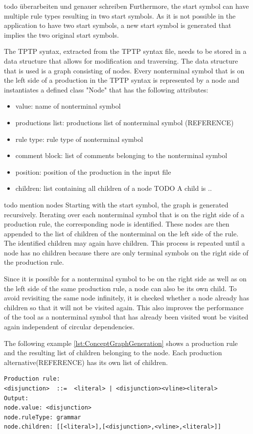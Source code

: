 todo überarbeiten und genauer schreiben
Furthermore, the start symbol can have multiple rule types resulting in two start symbols. As it is not possible in the application to have two start symbols, a new start symbol is generated that implies the two original start symbols. 

The \ac{TPTP} syntax, extracted from the \ac{TPTP} syntax file, needs to be stored in a data structure that allows for modification and traversing.
The data structure that is used is a graph consisting of nodes. 
Every nonterminal symbol that is on the left side of a production in the \ac{TPTP} syntax is represented by a node and instantiates a defined class "Node" that has the following attributes:
\begin{itemize}
\item value: name of nonterminal symbol
\item productions list: productions list of nonterminal symbol (REFERENCE)
\item rule type:  rule type of nonterminal symbol
\item comment block: list of comments belonging to the nonterminal symbol
\item position: position of the production in the input file
\item children: list containing all children of a node
TODO A child is ..
\end{itemize} 
todo mention nodes
Starting with the start symbol, the graph is generated recursively. Iterating over each nonterminal symbol that is on the right side of a production rule, the corresponding node is identified. These nodes are then appended to the list of children of the nonterminal on the left side of the rule. The identified children may again have children. This process is repeated until a node has no children because there are only terminal symbols on the right side of the production rule.

Since it is possible for a nonterminal symbol to be on the right side as well as on the left side of the same production rule, a node can also be its own child. To avoid revisiting the same node infinitely, it is checked whether a node already has children so that it will not be visited again. This also improves the performance of the tool as a nonterminal symbol that has already been visited wont be visited again independent of circular dependencies.

The following example \ref{lst:ConceptGraphGeneration} shows a production rule and the resulting list of children belonging to the node. Each production alternative(REFERENCE) has its own list of children. %
\begin{lstlisting}[caption= Graph generation,label= lst:ConceptGraphGeneration]
Production rule: 
<disjunction>  ::=  <literal> | <disjunction><vline><literal> 
Output:
node.value: <disjunction>
node.ruleType: grammar
node.children: [[<literal>],[<disjunction>,<vline>,<literal>]]
\end{lstlisting}

